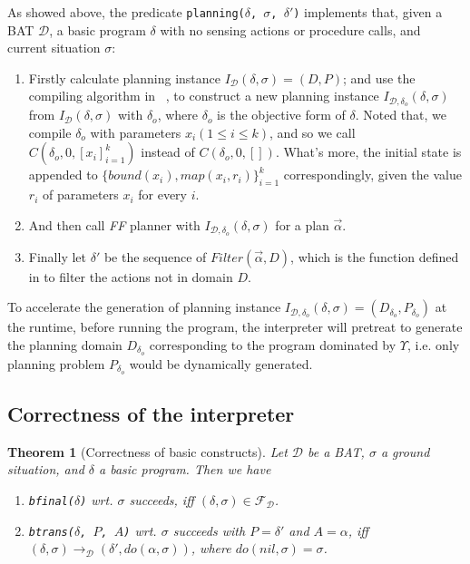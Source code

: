 \documentclass[letterpaper]{article}
\newtheorem{theorem}{Theorem}[section]
\begin{document}
As showed above, the predicate \texttt{planning($\delta$, $\sigma$, $\delta'$)} implements that, given a BAT $\mathcal{D}$, a basic program $\delta$ with no sensing actions or procedure calls, and current situation $\sigma$:
\begin{enumerate}
  \item Firstly calculate planning instance $I_{\mathcal{D}}(\delta, \sigma)=(D,P)$; and use the compiling algorithm in ~\cite{BFM07}, to construct a new planning instance $I_{\mathcal{D},\delta_o}(\delta, \sigma)$ from $I_{\mathcal{D}}(\delta, \sigma)$ with $\delta_o$, where $\delta_o$ is the objective form of $\delta$. Noted that, we compile $\delta_o$ with parameters $x_i(1\leq i\leq k)$, and so we call $C(\delta_o,0,[x_i]_{i=1}^k)$ instead of $C(\delta_o,0,[])$. What's more, the initial state is appended to $\{bound(x_i),map(x_i,r_i)\}_{i=1}^k$ correspondingly, given the value $r_i$ of parameters $x_i$ for every $i$.
  \item And then call \emph{FF} planner with $I_{\mathcal{D},\delta_o}(\delta, \sigma)$ for a plan $\vec{\alpha}$.
  \item Finally let $\delta'$ be the sequence of $Filter(\vec{\alpha}, D)$, which is the function defined in \cite{BFM07} to filter the actions not in domain $D$.
\end{enumerate}

To accelerate the generation of planning instance $I_{\mathcal{D},\delta_o}(\delta, \sigma) = (D_{\delta_o},P_{\delta_o})$ at the runtime, before running the program, the interpreter will pretreat to generate the planning domain $D_{\delta_o}$ corresponding to the program dominated by $\Upsilon$, i.e. only planning problem $P_{\delta_o}$ would be dynamically generated.

\subsection{Correctness of the interpreter}

\begin{theorem}[Correctness of basic constructs]\label{basic constructs theorem}
Let $\mathcal{D}$ be a BAT, $\sigma$ a ground situation, and $\delta$ a basic program. Then we have
\begin{enumerate}
  \item \texttt{bfinal($\delta$)} wrt. $\sigma$ succeeds, iff
$(\delta,\sigma)\in \mathcal{F_D}$.
  \item \texttt{btrans($\delta$, $P$, $A$)} wrt. $\sigma$ succeeds with $P = \delta'$ and $A = \alpha$, iff
$(\delta,\sigma)\rightarrow_\mathcal{D}(\delta',do(\alpha,\sigma))$, where $do(nil,\sigma)=\sigma$.
\end{enumerate}
\end{theorem}
\end{document}

